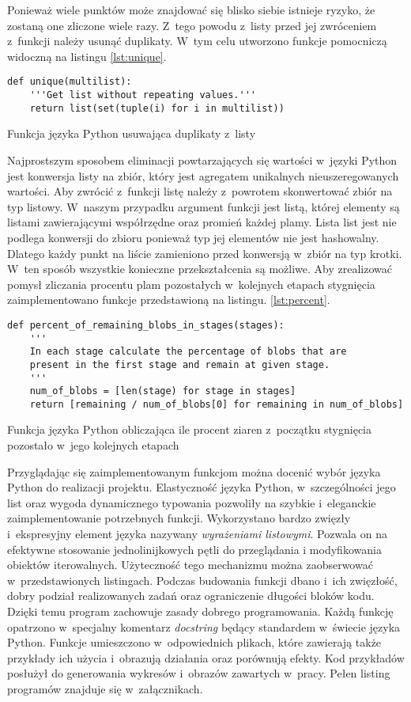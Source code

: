 Ponieważ wiele punktów może znajdować się blisko siebie istnieje ryzyko,
że zostaną one zliczone wiele razy.
Z~tego powodu z~listy przed jej zwróceniem z~funkcji należy usunąć duplikaty.
W~tym celu utworzono funkcje pomocniczą widoczną na listingu \ref{lst:unique}.
\begin{listing}[htbp]
\begin{verbatim}
def unique(multilist):
    '''Get list without repeating values.'''
    return list(set(tuple(i) for i in multilist))
\end{verbatim}
\caption{Funkcja języka Python usuwająca duplikaty z~listy}
\label{lst:unique}
\end{listing}
Najprostszym sposobem eliminacji powtarzających się wartości w~języki Python
jest konwersja listy na zbiór, który jest agregatem unikalnych 
nieuszeregowanych wartości.
Aby zwrócić z~funkcji listę należy z~powrotem skonwertować zbiór na typ
listowy.
W~naszym przypadku argument funkcji jest listą, której elementy są listami
zawierającymi współrzędne oraz promień każdej plamy.
Lista list jest nie podlega konwersji do zbioru ponieważ typ jej elementów
nie jest hashowalny.
Dlatego każdy punkt na liście zamieniono przed konwersją w~zbiór na typ
krotki.
W~ten sposób wszystkie konieczne przekształcenia są możliwe.
Aby zrealizować pomysł zliczania procentu plam pozostałych w~kolejnych etapach
stygnięcia zaimplementowano funkcje przedstawioną na listingu.
\ref{lst:percent}.
\begin{listing}[htbp]
\begin{verbatim}
def percent_of_remaining_blobs_in_stages(stages):
    '''
    In each stage calculate the percentage of blobs that are
    present in the first stage and remain at given stage.
    '''
    num_of_blobs = [len(stage) for stage in stages]
    return [remaining / num_of_blobs[0] for remaining in num_of_blobs]
\end{verbatim}
\caption{Funkcja języka Python obliczająca ile procent ziaren z~początku
         stygnięcia pozostało w~jego kolejnych etapach}
\label{lst:percent}
\end{listing}

Przyglądając się zaimplementowanym funkcjom można docenić wybór języka
Python do realizacji projektu.
Elastyczność języka Python, w~szczególności jego list oraz wygoda
dynamicznego typowania pozwoliły na szybkie i~eleganckie zaimplementowanie
potrzebnych funkcji.
Wykorzystano bardzo zwięzły i~ekspresyjny element języka nazywany
\emph{wyrażeniami listowymi}.
Pozwala on na efektywne stosowanie jednolinijkowych pętli do przeglądania
i modyfikowania obiektów iterowalnych.
Użyteczność tego mechanizmu można zaobserwować w~przedstawionych listingach.
Podczas budowania funkcji dbano i~ich zwięzłość, dobry podział realizowanych
zadań oraz ograniczenie długości bloków kodu.
Dzięki temu program zachowuje zasady dobrego programowania.
Każdą funkcję opatrzono w~specjalny komentarz \emph{docstring} będący
standardem w~świecie języka Python.
Funkcje umieszczono w~odpowiednich plikach, które zawierają także
przykłady ich użycia i~obrazują działania oraz porównują efekty.
Kod przykładów posłużył do generowania wykresów i~obrazów zawartych
w~pracy.
Pełen listing programów znajduje się w~załącznikach.


